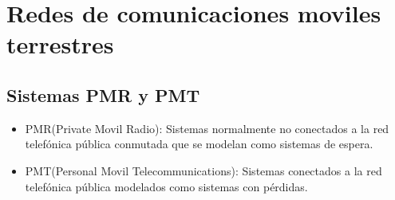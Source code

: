 \section{Redes de comunicaciones moviles terrestres}
\subsection{Sistemas \acrshort{PMR} y \acrshort{PMT}}
\begin{itemize}
\item{\acrshort{PMR}(Private Movil Radio):} Sistemas normalmente no conectados a la red telefónica pública conmutada que se modelan como sistemas de espera.
\item{PMT(Personal Movil Telecommunications):} Sistemas conectados a la red telefónica pública modelados como sistemas con pérdidas. 
\end{itemize}
